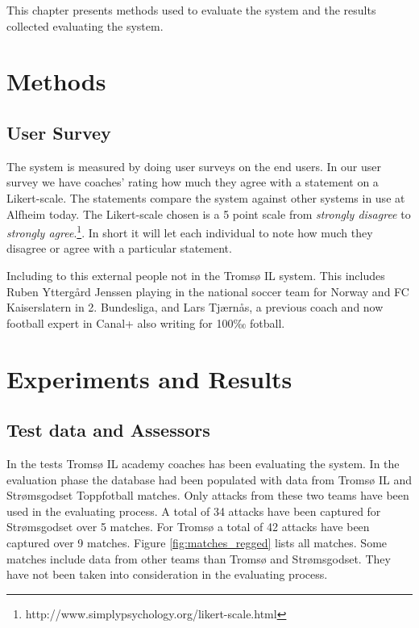 This chapter presents methods used to evaluate the system and the results collected evaluating the system. 

\section{Methods}
\subsection{User Survey}

The system is measured by doing user surveys on the end users. In our user survey we have coaches’ rating how much they agree with a statement on a Likert-scale. The statements compare the system against other systems in use at Alfheim today. The Likert-scale chosen is a 5 point scale from \textit{strongly disagree} to \textit{strongly agree}.\footnote{http://www.simplypsychology.org/likert-scale.html}. In short it will let each individual to note how much they disagree or agree with a particular statement.

Including to this external people not in the Tromsø IL system. This includes Ruben Yttergård Jenssen playing in the national soccer team for Norway and FC Kaiserslatern in 2. Bundesliga, and Lars Tjærnås, a previous coach and now football expert in Canal+ also writing for 100‰ fotball.

\section{Experiments and Results}

\subsection{Test data and Assessors}

In the tests Tromsø IL academy coaches has been evaluating the system. In the evaluation phase the database had been populated with data from Tromsø IL and Strømsgodset Toppfotball matches. Only attacks from these two teams have been used in the evaluating process. A total of 34 attacks have been captured for Strømsgodset over 5 matches. For Tromsø a total of 42 attacks have been captured over 9 matches. Figure \ref{fig:matches_regged} lists all matches. Some matches include data from other teams than Tromsø and Strømsgodset. They have not been taken into consideration in the evaluating process.

